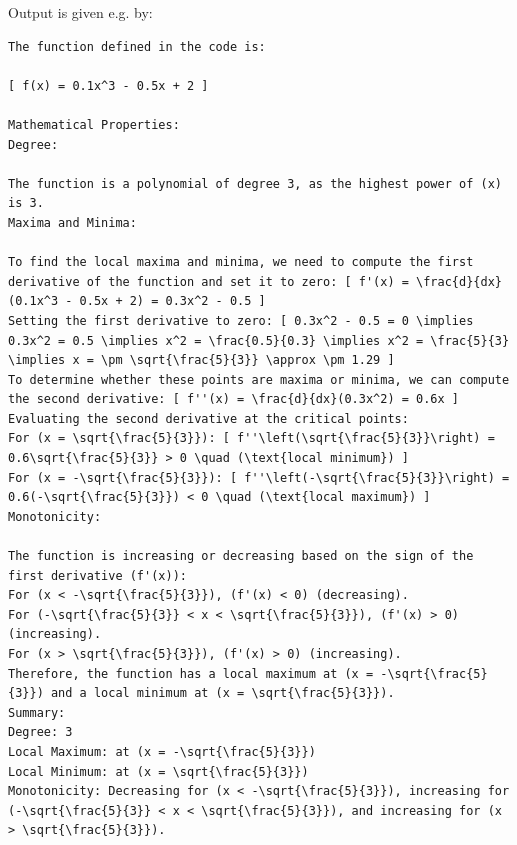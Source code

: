 Output is given e.g. by: 

{\footnotesize
\begin{lstlisting}
The function defined in the code is:

[ f(x) = 0.1x^3 - 0.5x + 2 ]

Mathematical Properties:
Degree:

The function is a polynomial of degree 3, as the highest power of (x) is 3.
Maxima and Minima:

To find the local maxima and minima, we need to compute the first derivative of the function and set it to zero: [ f'(x) = \frac{d}{dx}(0.1x^3 - 0.5x + 2) = 0.3x^2 - 0.5 ]
Setting the first derivative to zero: [ 0.3x^2 - 0.5 = 0 \implies 0.3x^2 = 0.5 \implies x^2 = \frac{0.5}{0.3} \implies x^2 = \frac{5}{3} \implies x = \pm \sqrt{\frac{5}{3}} \approx \pm 1.29 ]
To determine whether these points are maxima or minima, we can compute the second derivative: [ f''(x) = \frac{d}{dx}(0.3x^2) = 0.6x ]
Evaluating the second derivative at the critical points:
For (x = \sqrt{\frac{5}{3}}): [ f''\left(\sqrt{\frac{5}{3}}\right) = 0.6\sqrt{\frac{5}{3}} > 0 \quad (\text{local minimum}) ]
For (x = -\sqrt{\frac{5}{3}}): [ f''\left(-\sqrt{\frac{5}{3}}\right) = 0.6(-\sqrt{\frac{5}{3}}) < 0 \quad (\text{local maximum}) ]
Monotonicity:

The function is increasing or decreasing based on the sign of the first derivative (f'(x)):
For (x < -\sqrt{\frac{5}{3}}), (f'(x) < 0) (decreasing).
For (-\sqrt{\frac{5}{3}} < x < \sqrt{\frac{5}{3}}), (f'(x) > 0) (increasing).
For (x > \sqrt{\frac{5}{3}}), (f'(x) > 0) (increasing).
Therefore, the function has a local maximum at (x = -\sqrt{\frac{5}{3}}) and a local minimum at (x = \sqrt{\frac{5}{3}}).
Summary:
Degree: 3
Local Maximum: at (x = -\sqrt{\frac{5}{3}})
Local Minimum: at (x = \sqrt{\frac{5}{3}})
Monotonicity: Decreasing for (x < -\sqrt{\frac{5}{3}}), increasing for (-\sqrt{\frac{5}{3}} < x < \sqrt{\frac{5}{3}}), and increasing for (x > \sqrt{\frac{5}{3}}).
\end{lstlisting}
}

